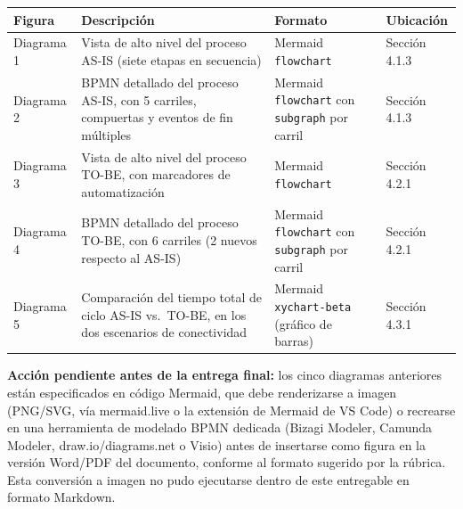 \documentclass[11pt,a4paper]{article}
\begin{document}
{\small
\begin{longtable}[]{@{}
  >{\raggedright\arraybackslash}p{}
  >{\raggedright\arraybackslash}p{}
  >{\raggedright\arraybackslash}p{}
  >{\raggedright\arraybackslash}p{}@{}}
\toprule\noalign{}
\begin{minipage}[b]{\linewidth}\raggedright
Figura
\end{minipage} & \begin{minipage}[b]{\linewidth}\raggedright
Descripción
\end{minipage} & \begin{minipage}[b]{\linewidth}\raggedright
Formato
\end{minipage} & \begin{minipage}[b]{\linewidth}\raggedright
Ubicación
\end{minipage} \\
\midrule\noalign{}
\endhead
\bottomrule\noalign{}
\endlastfoot
Diagrama 1 & Vista de alto nivel del proceso AS-IS (siete etapas en secuencia) & Mermaid \texttt{flowchart} & Sección 4.1.3 \\
Diagrama 2 & BPMN detallado del proceso AS-IS, con 5 carriles, compuertas y eventos de fin múltiples & Mermaid \texttt{flowchart} con \texttt{subgraph} por carril & Sección 4.1.3 \\
Diagrama 3 & Vista de alto nivel del proceso TO-BE, con marcadores de automatización & Mermaid \texttt{flowchart} & Sección 4.2.1 \\
Diagrama 4 & BPMN detallado del proceso TO-BE, con 6 carriles (2 nuevos respecto al AS-IS) & Mermaid \texttt{flowchart} con \texttt{subgraph} por carril & Sección 4.2.1 \\
Diagrama 5 & Comparación del tiempo total de ciclo AS-IS vs.~TO-BE, en los dos escenarios de conectividad & Mermaid \texttt{xychart-beta} (gráfico de barras) & Sección 4.3.1 \\
\end{longtable}
}

\textbf{Acción pendiente antes de la entrega final:} los cinco diagramas anteriores están especificados en código Mermaid, que debe renderizarse a imagen (PNG/SVG, vía mermaid.live o la extensión de Mermaid de VS Code) o recrearse en una herramienta de modelado BPMN dedicada (Bizagi Modeler, Camunda Modeler, draw.io/diagrams.net o Visio) antes de insertarse como figura en la versión Word/PDF del documento, conforme al formato sugerido por la rúbrica. Esta conversión a imagen no pudo ejecutarse dentro de este entregable en formato Markdown.
\end{document}
